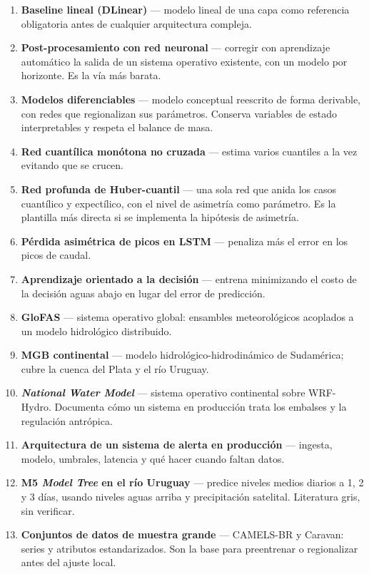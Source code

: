\documentclass{../comun/tesisuba}
\newcommand{\entrada}[2]{\item \textbf{#1} --- #2}
\begin{document}
\begin{enumerate}[leftmargin=*, itemsep=3pt]
\entrada{Baseline lineal (DLinear)}{modelo lineal de una capa como referencia obligatoria antes de
cualquier arquitectura compleja. \citet{zeng-2023-dlinear}}

\entrada{Post-procesamiento con red neuronal}{corregir con aprendizaje automático la salida de un
sistema operativo existente, con un modelo por horizonte. Es la vía más barata.
\citet{hunt-2022-lstm-refuerzo-pronosticos}}

\entrada{Modelos diferenciables}{modelo conceptual reescrito de forma derivable, con redes que
regionalizan sus parámetros. Conserva variables de estado interpretables y respeta el balance de
masa. \citet{feng-2022-modelos-diferenciables}}

\entrada{Red cuantílica monótona no cruzada}{estima varios cuantiles a la vez evitando que se
crucen. \citet{cannon-2018-mcqrnn-noncrossing}}

\entrada{Red profunda de Huber-cuantil}{una sola red que anida los casos cuantílico y expectílico,
con el nivel de asimetría como parámetro. Es la plantilla más directa si se implementa la
hipótesis de asimetría. \citet{tyralis-2025-deep-huber-quantile-networks}}

\entrada{Pérdida asimétrica de picos en LSTM}{penaliza más el error en los picos de caudal.
\citet{tofighi-2025-asymmetric-peak-loss}}

\entrada{Aprendizaje orientado a la decisión}{entrena minimizando el costo de la decisión aguas
abajo en lugar del error de predicción. \citet{elmachtoub-grigas-2022-smart-predict-optimize}}

\entrada{GloFAS}{sistema operativo global: ensambles meteorológicos acoplados a un modelo
hidrológico distribuido. \citet{alfieri-2013-glofas}}

\entrada{MGB continental}{modelo hidrológico-hidrodinámico de Sudamérica; cubre la cuenca del
Plata y el río Uruguay. \citet{siqueira-2018-mgb-sudamerica}}

\entrada{\textit{National Water Model}}{sistema operativo continental sobre WRF-Hydro. Documenta
cómo un sistema en producción trata los embalses y la regulación antrópica.
\citet{cosgrove-2024-national-water-model}}

\entrada{Arquitectura de un sistema de alerta en producción}{ingesta, modelo, umbrales, latencia y
qué hacer cuando faltan datos. \citet{nevo-2022-pronostico-operativo-ml}}

\entrada{M5 \textit{Model Tree} en el río Uruguay}{predice niveles medios diarios a 1, 2 y 3 días,
usando niveles aguas arriba y precipitación satelital. Literatura gris, sin verificar.
\citet{mattiuzi-2021-m5-uruguai}}

\entrada{Conjuntos de datos de muestra grande}{CAMELS-BR y Caravan: series y atributos
estandarizados. Son la base para preentrenar o regionalizar antes del ajuste local.
\citet{chagas-2020-camels-br, kratzert-2023-caravan}}

\end{enumerate}
\end{document}
